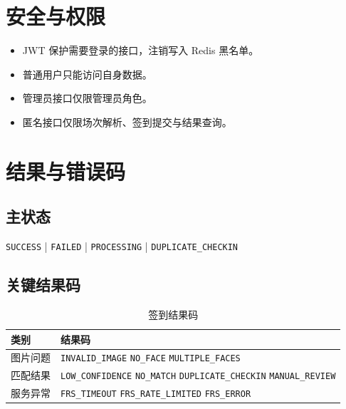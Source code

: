 \documentclass[11pt,a4paper]{ctexart}
\begin{document}
\section{安全与权限}
\begin{itemize}[leftmargin=2.5em]
  \item JWT 保护需要登录的接口，注销写入 Redis 黑名单。
  \item 普通用户只能访问自身数据。
  \item 管理员接口仅限管理员角色。
  \item 匿名接口仅限场次解析、签到提交与结果查询。
\end{itemize}

\section{结果与错误码}

\subsection{主状态}
\begin{center}
\texttt{SUCCESS} \quad | \quad
\texttt{FAILED} \quad | \quad
\texttt{PROCESSING} \quad | \quad
\texttt{DUPLICATE\_CHECKIN}
\end{center}

\subsection{关键结果码}

\begin{table}[htbp]
\centering
\caption{签到结果码}
\label{tab:result-codes}
\begin{tabularx}{\textwidth}{@{}p{2.6cm} >{\raggedright\arraybackslash}X@{}}
\toprule
类别 & 结果码 \\
\midrule
图片问题 & \texttt{INVALID\_IMAGE} \quad \texttt{NO\_FACE} \quad \texttt{MULTIPLE\_FACES} \\
匹配结果 & \texttt{LOW\_CONFIDENCE} \quad \texttt{NO\_MATCH} \quad \texttt{DUPLICATE\_CHECKIN} \quad \texttt{MANUAL\_REVIEW} \\
服务异常 & \texttt{FRS\_TIMEOUT} \quad \texttt{FRS\_RATE\_LIMITED} \quad \texttt{FRS\_ERROR} \\
\bottomrule
\end{tabularx}
\end{table}
\end{document}
